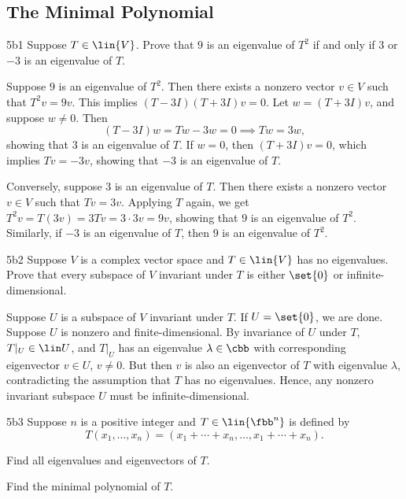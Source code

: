 \subsection{The Minimal Polynomial}

\begin{exercise}{5b1}
    Suppose $T \in \lin{V}$.
	Prove that $9$ is an eigenvalue of $T^2$ if and only if $3$ or $-3$ is an eigenvalue of $T$.
\end{exercise}

\begin{sol}
    Suppose $9$ is an eigenvalue of $T^2$.
	Then there exists a nonzero vector $v \in V$ such that $T^2 v = 9v$.
	This implies $(T - 3I)(T + 3I)v = 0$.
	Let $w = (T + 3I)v$, and suppose $w \neq 0$.
	Then
    \[
    	(T - 3I)w = Tw - 3w = 0 \implies Tw = 3w,
    \]
    showing that 3 is an eigenvalue of $T$.
	If $w = 0$, then $(T + 3I)v = 0$, which implies $Tv = -3v$, showing that $-3$ is an eigenvalue of $T$.

    Conversely, suppose 3 is an eigenvalue of $T$.
	Then there exists a nonzero vector $v \in V$ such that $Tv = 3v$.
	Applying $T$ again, we get $T^2 v = T(3v) = 3Tv = 3 \cdot 3v = 9v$, showing that $9$ is an eigenvalue of $T^2$.
	Similarly, if $-3$ is an eigenvalue of $T$, then $9$ is an eigenvalue of $T^2$.
\end{sol}

\begin{exercise}{5b2}
    Suppose $V$ is a complex vector space and $T \in \lin{V}$ has no eigenvalues.
	Prove that every subspace of $V$ invariant under $T$ is either $\set{0}$ or infinite-dimensional.
\end{exercise}

\begin{sol}
    Suppose $U$ is a subspace of $V$ invariant under $T$.
	If $U = \set{0}$, we are done.
	Suppose $U$ is nonzero and finite-dimensional.
	By invariance of $U$ under $T$, $T|_U \in \lin U$, and $T|_U$ has an eigenvalue $\lambda \in \cbb$ with corresponding eigenvector $v \in U$, $v \neq 0$.
	But then $v$ is also an eigenvector of $T$ with eigenvalue $\lambda$, contradicting the assumption that $T$ has no eigenvalues.
	Hence, any nonzero invariant subspace $U$ must be infinite-dimensional.
\end{sol}

\begin{exercise}{5b3}
    Suppose $n$ is a positive integer and $T \in \lin{\fbb^n}$ is defined by
    \[
    	T(x_1, \ldots, x_n) = (x_1 + \cdots + x_n, \ldots, x_1 + \cdots + x_n).
    \]
    \begin{subexercises}
        \item Find all eigenvalues and eigenvectors of $T$.
        \item Find the minimal polynomial of $T$.
    \end{subexercises}
\end{exercise}


